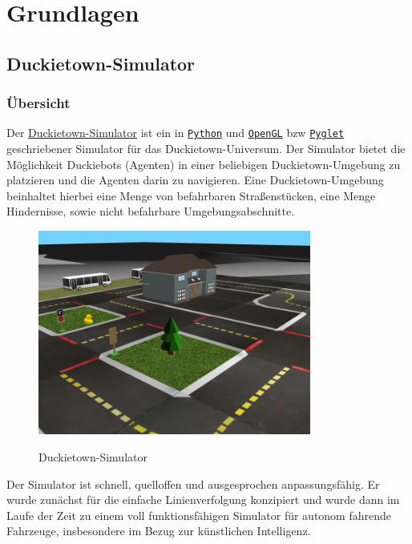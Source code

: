 \chapter{Grundlagen}

\section{Duckietown-Simulator}

\subsection{Übersicht}

Der \href{https://github.com/duckietown/gym-duckietown}{Duckietown-Simulator} ist ein in \href{https://www.python.org/}{\texttt{Python}} und \href{https://www.opengl.org/}{\texttt{OpenGL}} \acf{bzw} \href{http://pyglet.org/}{\texttt{Pyglet}} geschriebener Simulator für das \glqq Duckietown-Universum\grqq. Der Simulator bietet die Möglichkeit Duckiebots (Agenten) in einer beliebigen Duckietown-Umgebung zu platzieren und die Agenten darin zu navigieren. Eine Duckietown-Umgebung beinhaltet hierbei eine Menge von befahrbaren Straßenstücken, eine Menge Hindernisse, sowie nicht befahrbare Umgebungsabschnitte. \cite{gym_duckietown} \\

\begin{figure}[H]
	\centering
	\includegraphics[width=0.8\textwidth]{kapitel2/images/duckietown-gym.png}
	\label{fig:duckietown-gym}
	\caption{Duckietown-Simulator}
\end{figure}

Der Simulator ist schnell, quelloffen und ausgesprochen anpassungsfähig. Er wurde zunächst für die einfache Linienverfolgung konzipiert und wurde dann im Laufe der Zeit zu einem voll funktionsfähigen Simulator für autonom fahrende Fahrzeuge, insbesondere im Bezug zur künstlichen Intelligenz. \cite{gym_duckietown}


